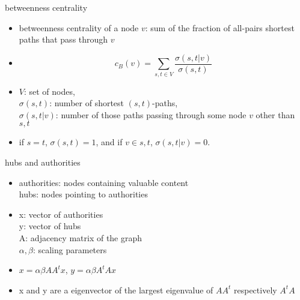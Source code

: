 \documentclass[12pt]{beamer}
\begin{document}
	\begin{frame}{betweenness centrality}
		\begin{itemize}
			\item betweenness centrality of a node $v$: sum of the
			fraction of all-pairs shortest paths that pass through $v$
			\item 		
			\begin{equation*}
			c_B(v) =\sum_{s,t \in V} \frac{\sigma(s, t|v)}{\sigma(s, t)}
			\end{equation*}	
			\item  $V$: set of nodes,\\
			$\sigma(s, t)$: number of
			shortest $(s, t)$-paths, \\
			$\sigma(s, t|v)$: number of those
			paths  passing through some  node $v$ other than $s, t$
			\item if $s = t$, $\sigma(s, t) = 1$, and if $v \in {s, t}$,
			$\sigma(s, t|v) = 0$.
		\end{itemize}
	\end{frame}
	\begin{frame}{hubs and authorities}
		\begin{itemize}
			\item authorities: nodes containing valuable content\\
			hubs: nodes pointing to authorities
			\item x: vector of authorities \\
			y: vector of hubs \\
			A: adjacency matrix of the graph \\
			$\alpha,\beta$: scaling parameters
			\item $x = \alpha \beta A A^t x$, $y = \alpha \beta A^t A x$
			\item x and y are a eigenvector of the largest eigenvalue of $A A^t$ respectively $A^t A$
		\end{itemize}
	\end{frame}
\end{document}
